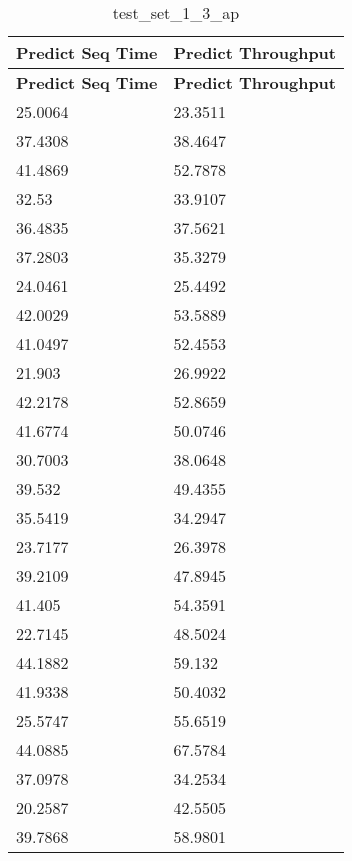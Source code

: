 \documentclass[bwprint]{gmcmthesis}
\begin{document}
\begin{longtable}{ll}
\caption{test\_set\_1\_3\_ap} \\ %
\hline
\textbf{Predict Seq Time} & \textbf{Predict Throughput} \\ 
\hline
\endfirsthead

\hline
\textbf{Predict Seq Time} & \textbf{Predict Throughput} \\ 
\hline
\endhead

\hline
\endfoot

25.0064           & 23.3511            \\
37.4308           & 38.4647            \\
41.4869           & 52.7878            \\
32.53             & 33.9107            \\
36.4835           & 37.5621            \\
37.2803           & 35.3279            \\
24.0461           & 25.4492            \\
42.0029           & 53.5889            \\
41.0497           & 52.4553            \\
21.903            & 26.9922            \\
42.2178           & 52.8659            \\
41.6774           & 50.0746            \\
30.7003           & 38.0648            \\
39.532            & 49.4355            \\
35.5419           & 34.2947            \\
23.7177           & 26.3978            \\
39.2109           & 47.8945            \\
41.405            & 54.3591            \\
22.7145           & 48.5024            \\
44.1882           & 59.132             \\
41.9338           & 50.4032            \\
25.5747           & 55.6519            \\
44.0885           & 67.5784            \\
37.0978           & 34.2534            \\
20.2587           & 42.5505            \\
39.7868           & 58.9801            \\

\end{longtable}
\end{document}
